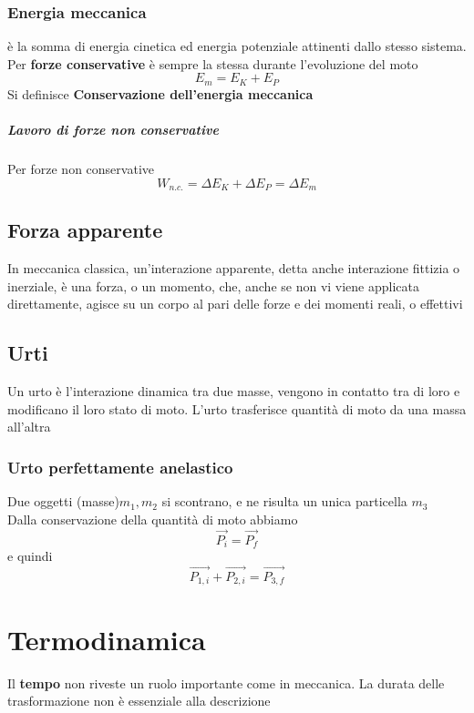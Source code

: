 \documentclass[a4paper]{report}
\begin{document}
  \subsection{Energia meccanica}
  è la somma di energia cinetica ed energia potenziale attinenti dallo stesso sistema.\\
  Per \textbf{forze conservative} è sempre la stessa durante l'evoluzione del moto
  \[ E_m = E_K + E_P \]
  Si definisce \textbf{Conservazione dell'energia meccanica}
  \paragraph{Lavoro di forze non conservative}
  Per forze non conservative
  \[ W_{n.c.} = \Delta E_K + \Delta E_P = \Delta E_m \]

  \section{Forza apparente}
  In meccanica classica, un'interazione apparente, detta anche interazione fittizia o inerziale, è una forza, o un momento, che, anche se non vi viene applicata direttamente, agisce su un corpo al pari delle forze e dei momenti reali, o effettivi

  \section{Urti}
  Un urto è l'interazione dinamica tra due masse, vengono in contatto tra di loro e modificano il loro stato di moto.
  L'urto trasferisce quantità di moto da una massa all'altra
  \subsection{Urto perfettamente anelastico}
  Due oggetti (masse)$m_1, m_2$ si scontrano, e ne risulta un unica particella $m_3$\\
  Dalla conservazione della quantità di moto abbiamo
  \[ \vec{P_i} = \vec{P_f} \]
  e quindi
  \[ \vec{P_{1,i}} + \vec{P_{2,i}} = \vec{P_{3,f}} \]




  \chapter{Termodinamica}
  Il \textbf{tempo} non riveste un ruolo importante come in meccanica. La durata delle trasformazione non è essenziale alla descrizione
\end{document}
